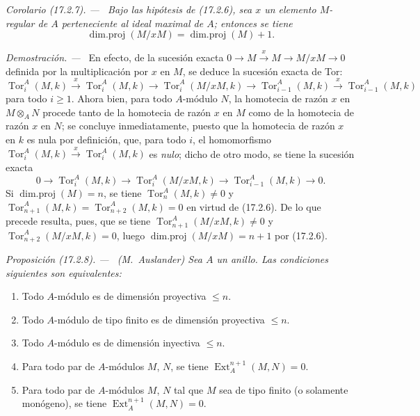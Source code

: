 \documentclass[10pt,oneside]{book}
\makeatletter
\newcommand{\setmanualcurrentlabel}[1]{\def\@currentlabel{#1}}
\newenvironment{proposition}[1][]{%
  \setmanualcurrentlabel{#1}\par\medskip\noindent\itshape Proposición (#1). ---\ }{\par}
\newenvironment{corollary}[1][]{%
  \setmanualcurrentlabel{#1}\par\medskip\noindent\itshape Corolario (#1). ---\ }{\par}
\newenvironment{proof}{%
  \par\medskip\noindent\textit{Demostración. ---\ }}{\par}
\makeatother
\begin{document}
\begin{corollary}[17.2.7]
\label{0.17.2.7-es}
Bajo las hipótesis de \textup{(17.2.6)}, sea $x$ un elemento $M$-regular de $A$
perteneciente al ideal maximal de $A$; entonces se tiene
\begin{equation}
\label{0.17.2.7.1-es}
\tag{17.2.7.1}
  \operatorname{dim.proj}(M/xM)=\operatorname{dim.proj}(M)+1.
\end{equation}
\end{corollary}

\begin{proof}
En efecto, de la sucesión exacta
$0\longrightarrow M\xrightarrow{x}M\longrightarrow M/xM\longrightarrow0$
definida por la multiplicación por $x$ en $M$, se deduce la sucesión exacta de
Tor:
\[
  \operatorname{Tor}^A_i(M,k)\xrightarrow{x}
  \operatorname{Tor}^A_i(M,k)\longrightarrow
  \operatorname{Tor}^A_i(M/xM,k)\longrightarrow
  \operatorname{Tor}^A_{i-1}(M,k)\xrightarrow{x}
  \operatorname{Tor}^A_{i-1}(M,k)
\]
para todo $i\geq1$. Ahora bien, para todo $A$-módulo $N$, la homotecia de razón $x$
en $M\otimes_A N$ procede tanto de la homotecia de razón $x$ en
$M$ como de la homotecia de razón $x$ en $N$; se concluye inmediatamente,
puesto que la homotecia de razón $x$ en $k$ es nula por definición, que,
para todo $i$, el homomorfismo
$\operatorname{Tor}^A_i(M,k)\xrightarrow{x}\operatorname{Tor}^A_i(M,k)$ es
\emph{nulo}; dicho de otro modo, se tiene la sucesión exacta
\[
  0\longrightarrow\operatorname{Tor}^A_i(M,k)\longrightarrow
  \operatorname{Tor}^A_i(M/xM,k)\longrightarrow
  \operatorname{Tor}^A_{i-1}(M,k)\longrightarrow0.
\]
Si $\operatorname{dim.proj}(M)=n$, se tiene
$\operatorname{Tor}^A_n(M,k)\neq0$ y
$\operatorname{Tor}^A_{n+1}(M,k)=\operatorname{Tor}^A_{n+2}(M,k)=0$ en virtud
de (17.2.6). De lo que precede resulta, pues, que se tiene
$\operatorname{Tor}^A_{n+1}(M/xM,k)\neq0$ y
$\operatorname{Tor}^A_{n+2}(M/xM,k)=0$, luego
$\operatorname{dim.proj}(M/xM)=n+1$ por (17.2.6).
\end{proof}

\begin{proposition}[17.2.8]
\label{0.17.2.8-es}
\textnormal{(M.~Auslander)} Sea $A$ un anillo. Las condiciones siguientes son
equivalentes:
\begin{enumerate}
  \item[\rm a)] Todo $A$-módulo es de dimensión proyectiva $\leq n$.
  \item[\rm a')] Todo $A$-módulo de tipo finito es de dimensión proyectiva
  $\leq n$.
  \item[\rm b)] Todo $A$-módulo es de dimensión inyectiva $\leq n$.
  \item[\rm c)] Para todo par de $A$-módulos $M$, $N$, se tiene
  $\operatorname{Ext}^{n+1}_A(M,N)=0$.
  \item[\rm c')] Para todo par de $A$-módulos $M$, $N$ tal que $M$ sea de
  tipo finito \textup{(o solamente} monógeno\textup{)}, se tiene
  $\operatorname{Ext}^{n+1}_A(M,N)=0$.
\end{enumerate}
\end{proposition}
\end{document}
